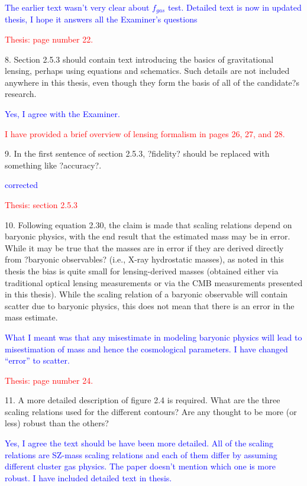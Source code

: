 \documentclass[11pt,a4paper]{article}
\begin{document}
\textcolor{blue}{The earlier text wasn't very clear about $f_{gas}$ test. Detailed text is now in updated thesis, I hope it answers all the Examiner's questions}

\textcolor{red}{Thesis: page number 22.}


8. Section 2.5.3 should contain text introducing the basics of gravitational lensing,
perhaps using equations and schematics. Such details are not included
anywhere in this thesis, even though they form the basis of all of the candidate?s
research.

\textcolor{blue}{Yes, I agree with the Examiner.}

\textcolor{red}{I have provided a brief overview of lensing formalism in pages 26, 27, and 28.}

9. In the first sentence of section 2.5.3, ?fidelity? should be replaced with something
like ?accuracy?.

\textcolor{blue}{corrected}

\textcolor{red}{Thesis: section 2.5.3}

10. Following equation 2.30, the claim is made that scaling relations depend on
baryonic physics, with the end result that the estimated mass may be in error.
While it may be true that the masses are in error if they are derived directly from
?baryonic observables? (i.e., X-ray hydrostatic masses), as noted in this thesis
the bias is quite small for lensing-derived masses (obtained either via traditional
optical lensing measurements or via the CMB measurements presented in this
thesis). While the scaling relation of a baryonic observable will contain scatter
due to baryonic physics, this does not mean that there is an error in the mass
estimate.

\textcolor{blue}{What I meant was that any misestimate in modeling baryonic physics will lead to misestimation of mass and hence the cosmological parameters. I have changed ``error'' to scatter.}

\textcolor{red}{Thesis: page number 24.}


11. A more detailed description of figure 2.4 is required. What are the three scaling
relations used for the different contours? Are any thought to be more (or less)
robust than the others?

\textcolor{blue}{Yes, I agree the text should be have been more detailed. All of the scaling relations are SZ-mass scaling relations and each of them differ by assuming different cluster gas physics. The paper doesn't  mention which one is more robust. I have included detailed text in thesis.}
\end{document}
